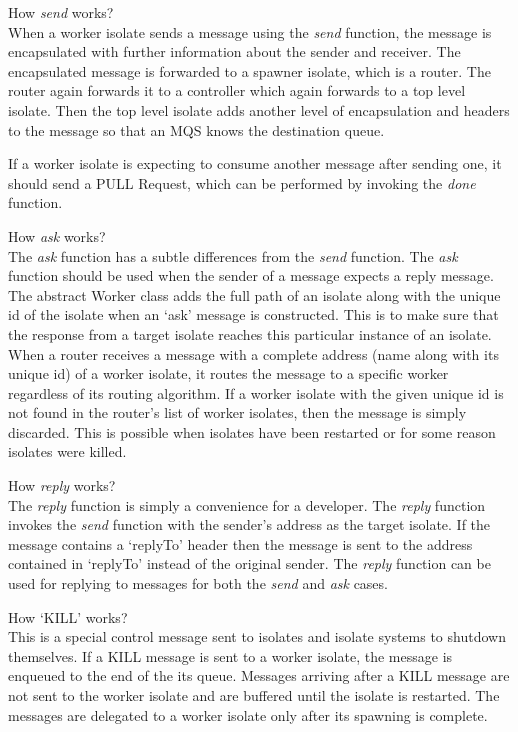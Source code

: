   \begin{description}
    \item How \emph{send} works?\\
      When a worker isolate sends a message using the \emph{send} function, the message is encapsulated with further information about the sender and receiver. The encapsulated message is forwarded to a spawner isolate, which is a router. The router again forwards it to a controller which again forwards to a top level isolate. Then the top level isolate adds another level of encapsulation and headers to the message so that an MQS knows the destination queue.

      If a worker isolate is expecting to consume another message after sending one, it should send a PULL Request, which can be performed by invoking the \emph{done} function.

      \item \label{itm:askWorking}How \emph{ask} works?\\
    The \emph{ask} function has a subtle differences from the \emph{send} function. The \emph{ask} function should be used when the sender of a message expects a reply message. The abstract Worker class adds the full path of an isolate along with the unique id of the isolate when an ‘ask’ message is constructed. This is to make sure that the response from a target isolate reaches this particular instance of an isolate. When a router receives a message with a complete address (name along with its unique id) of a worker isolate, it routes the message to a specific worker regardless of its routing algorithm. If a worker isolate with the given unique id is not found in the router's list of worker isolates, then the message is simply discarded. This is possible when isolates have been restarted or for some reason isolates were killed.

    \item How \emph{reply} works?\\
    The \emph{reply} function is simply a convenience for a developer. The \emph{reply} function invokes the \emph{send} function with the sender’s address as the target isolate. If the message contains a ‘replyTo’ header then the message is sent to the address contained in ‘replyTo’ instead of the original sender. The \emph{reply} function can be used for replying to messages for both the \emph{send} and \emph{ask} cases.

    \item \label{itm:killWorking} How ‘KILL’ works?\\
    This is a special control message sent to isolates and isolate systems to shutdown themselves. If a KILL message is sent to a worker isolate, the message is enqueued to the end of the its queue. Messages arriving after a KILL message are not sent to the worker isolate and are buffered until the isolate is restarted. The messages are delegated to a worker isolate only after its spawning is complete.


\end{description}
